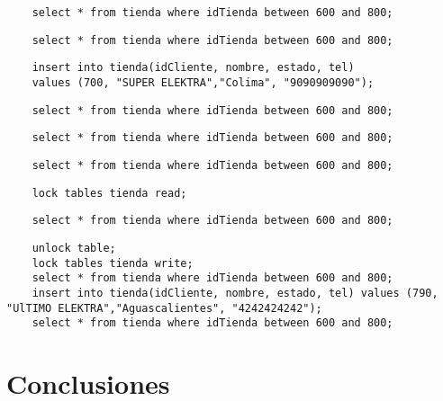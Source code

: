 \documentclass[12pt, titlepage]{article}
\begin{document}
	\begin{lstlisting}
	select * from tienda where idTienda between 600 and 800;
	\end{lstlisting}
	
	\begin{lstlisting}
	select * from tienda where idTienda between 600 and 800;
	\end{lstlisting}
	
	\begin{lstlisting}
	insert into tienda(idCliente, nombre, estado, tel)
	values (700, "SUPER ELEKTRA","Colima", "9090909090");
	\end{lstlisting}
	
	\begin{lstlisting}
	select * from tienda where idTienda between 600 and 800;
	\end{lstlisting}
	
	\begin{lstlisting}
	select * from tienda where idTienda between 600 and 800;
	\end{lstlisting}
	
	\begin{lstlisting}
	select * from tienda where idTienda between 600 and 800;
	\end{lstlisting}
	
	\begin{lstlisting}
	lock tables tienda read;
	\end{lstlisting}
	
	\begin{lstlisting}
	select * from tienda where idTienda between 600 and 800;
	\end{lstlisting}
	
	\begin{lstlisting}
	unlock table;
	lock tables tienda write;
	select * from tienda where idTienda between 600 and 800;
	insert into tienda(idCliente, nombre, estado, tel) values (790, "UlTIMO ELEKTRA","Aguascalientes", "4242424242"); 
	select * from tienda where idTienda between 600 and 800;
	\end{lstlisting}
	
	\section{Conclusiones}
	 
	
\end{document}
